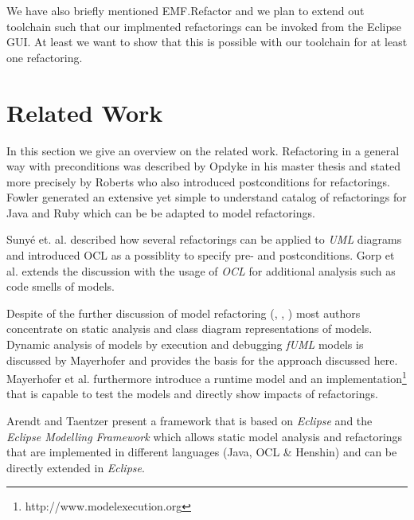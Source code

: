 \documentclass{llncs}
\begin{document}
We have also briefly mentioned EMF.Refactor and we plan to extend out toolchain such that our implmented refactorings
can be invoked from the Eclipse GUI. At least we want to show that this is possible with our toolchain for at least one refactoring.

\section{Related Work}
\label{sec:relatedwork}

In this section we give an overview on the related work. Refactoring in a general way with preconditions was described
by Opdyke \cite{mast:REFOOF} in his master thesis and stated more precisely by Roberts \cite{rob99} who also introduced
postconditions for refactorings. Fowler \cite{fow99} generated an extensive yet simple to understand catalog of
refactorings for Java and Ruby which can be be adapted to model refactorings.


Suny{\'e} et. al. \cite{DBLP:conf/uml/SunyePTJ01} described how several refactorings can be applied to \textit{UML}
diagrams and introduced OCL as a possiblity to specify pre- and postconditions. Gorp et al. \cite{gorp03} extends the
discussion with the usage of \textit{OCL} for additional analysis such as code smells of models.


Despite of the further discussion of model refactoring (\cite{DBLP:conf/uml/CorreaW04}, \cite{DBLP:conf/ershov/BaarM06},
\cite{DBLP:journals/ase/ArendtT13}) most authors concentrate on static analysis and class diagram representations of
models. Dynamic analysis of models by execution and debugging \textit{fUML} models is discussed by Mayerhofer
\cite{DBLP:conf/icse/Mayerhofer12} and provides the basis for the approach discussed here. Mayerhofer et al.
\cite{DBLP:conf/models/MayerhoferLK12} furthermore introduce a runtime model and an
implementation\footnote{http://www.modelexecution.org} that is capable to test the models and directly show impacts of
refactorings.


Arendt and Taentzer \cite{DBLP:journals/ase/ArendtT13} present a framework that is based on \textit{Eclipse} and the
\textit{Eclipse Modelling Framework} which allows static model analysis and refactorings that are implemented in
different languages (Java, OCL \& Henshin) and can be directly extended in \textit{Eclipse}.
\end{document}
